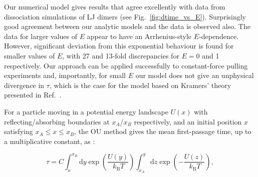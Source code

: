 \documentclass[twocolumn,pre,aps,showpacs,a4paper,floatfix,amssymb]{revtex4-1}
\newcommand{\kBT}{\,k_\mathrm{B}T}
\newcommand{\refref}[1]{Ref.~\cite{#1}}
\newcommand{\refig}[1]{Fig.~\ref{#1}}
\newcommand{\ud}{\mathrm{d}}
\begin{document}
Our numerical model gives results that agree excellently with data from dissociation simulations of LJ dimers (see \refig{fig:dtime_vs_E}). Surprisingly good agreement between our analytic models and the data is observed also. The data for larger values of $E$ appear to have an Arrhenius-style $E$-dependence. However, significant deviation from this exponential behaviour is found for smaller values of $E$, with 27 and 13-fold discrepancies for $E=0$ and 1 respectively. Our approach can be applied successfully to constant-force pulling experiments and, importantly, for small $E$ our model does not give an unphysical divergence in $\tau$, which is the case for the model based on Kramers' theory presented in \refref{dudko2006intrinsic}.



For a particle moving in a potential energy landscape $U(x)$ with reflecting/absorbing boundaries at $x_A$/$x_B$ respectively, and an initial position $x$ satisfying $x_A \leq x \leq x_B$, the OU method gives the mean first-passage time, up to a multiplicative constant, as \cite{uhlenbeck1930theory,gardiner2004handbook}:

\begin{equation}
\tau = C \int_{x}^{x_B} \ud y \exp\left(\frac{U(y)}{\kBT}\right)\int_{x_A}^y \ud z \exp\left( -\frac{U(z)}{\kBT}\right),
\label{eq:OU}
\end{equation}

\end{document}
